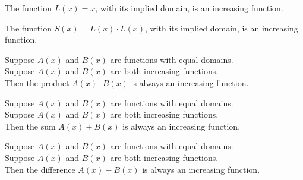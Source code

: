 \documentclass{ximera}
\begin{document}
\begin{exercise}
The function $L(x) = x$, with its implied domain, is an increasing function.

\begin{multipleChoice}
\end{multipleChoice}

\end{exercise}



\begin{exercise}
The function $S(x) = L(x) \cdot L(x)$, with its implied domain, is an increasing function.

\begin{multipleChoice}
\end{multipleChoice}

\end{exercise}




\begin{exercise}
Suppose $A(x)$ and $B(x)$ are functions with equal domains. \\
Suppose $A(x)$ and $B(x)$ are both increasing functions. \\
Then the product $A(x) \cdot B(x)$ is always an increasing function.

\begin{multipleChoice}
\end{multipleChoice}

\end{exercise}





\begin{exercise}
Suppose $A(x)$ and $B(x)$ are functions with equal domains. \\
Suppose $A(x)$ and $B(x)$ are both increasing functions. \\
Then the sum $A(x) + B(x)$ is always an increasing function.

\begin{multipleChoice}
\end{multipleChoice}

\end{exercise}




\begin{exercise}
Suppose $A(x)$ and $B(x)$ are functions with equal domains. \\
Suppose $A(x)$ and $B(x)$ are both increasing functions. \\
Then the difference $A(x) - B(x)$ is always an increasing function.

\begin{multipleChoice}
\end{multipleChoice}

\end{exercise}
\end{document}
